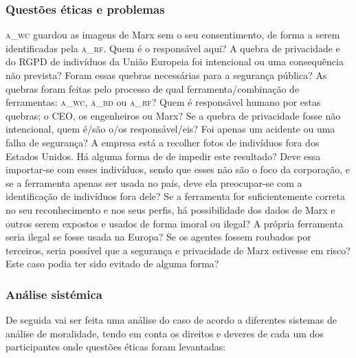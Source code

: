 \documentclass[12pt]{../diazessay}
\begin{document}
\subsubsection*{Questões éticas e problemas}
\textsc{a\_wc} guardou as imagens de Marx sem o seu consentimento, de forma a serem identificadas pela \textsc{a\_rf}. Quem é o responsável aqui? A quebra de privacidade e do RGPD de indivíduos da União Europeia foi intencional ou uma consequência não prevista? Foram essas quebras necessárias para a segurança pública? As quebras foram feitas pelo processo de qual ferramenta/combinação de ferramentas: \textsc{a\_wc}, \textsc{a\_bd} ou \textsc{a\_rf}? Quem é responsável humano por estas quebras; o CEO, os engenheiros ou Marx? Se a quebra de privacidade fosse não intencional, quem é/são o/os responsável/eis? Foi apenas um acidente ou uma falha de segurança? A empresa está a recolher fotos de indivíduos fora dos Estados Unidos. Há alguma forma de de impedir este resultado? Deve essa importar-se com esses indivíduos, sendo que esses não são o foco da corporação, e se a ferramenta apenas ser usada no país, deve ela preocupar-se com a identificação de indivíduos fora dele? Se a ferramenta for suficientemente correta no seu reconhecimento e nos seus perfis, há possibilidade dos dados de Marx e outros serem expostos e usados de forma imoral ou ilegal? A própria ferramenta seria ilegal se fosse usada na Europa? Se os agentes fossem roubados por terceiros, seria possível que a segurança e privacidade de Marx estivesse em risco? Este caso podia ter sido evitado de alguma forma?
\subsubsection*{Análise sistémica}
De seguida vai ser feita uma análise do caso de acordo a diferentes sistemas de análise de moralidade, tendo em conta os direitos e deveres de cada um dos participantes onde questões éticas foram levantadas:
\end{document}
